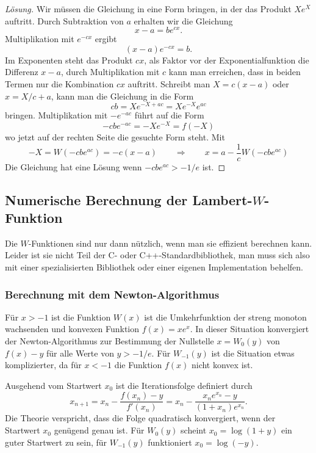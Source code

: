 \begin{proof}[Lösung]
Wir müssen die Gleichung in eine Form bringen, in der das Produkt 
$Xe^X$ auftritt.
Durch Subtraktion von $a$ erhalten wir die Gleichung 
\[
x-a = be^{cx}.
\]
Multiplikation mit $e^{-cx}$ ergibt
\[
(x-a)e^{-cx}=b.
\]
Im Exponenten steht das Produkt $cx$, als Faktor vor der Exponentialfunktion
die Differenz $x-a$, durch Multiplikation mit $c$ kann man erreichen,
dass in beiden Termen nur die Kombination $cx$ auftritt.
Schreibt man $X=c(x-a)$ oder $x=X/c+a$, kann man die Gleichung in die Form
\[
cb
=
Xe^{-X+ac}
=
Xe^{-X}e^{ac}
\]
bringen.
Multiplikation mit $-e^{-ac}$ führt auf die Form
\[
-cbe^{-ac}
=
-Xe^{-X}
=
f(-X)
\]
wo jetzt auf der rechten Seite die gesuchte Form steht.
Mit 
\[
-X
=
W(-cbe^{ac})
=
-c(x-a)
\qquad\Rightarrow\qquad
x
=
a
-
\frac{1}{c}
W(-cbe^{ac})
\]
Die Gleichung hat eine Lösung wenn $-cbe^{ac} > -1/e$ ist.
\end{proof}

%
%
\subsection{Numerische Berechnung der Lambert-$W$-Funktion
\label{buch:subsection:lambertberechnung}}
Die $W$-Funktionen sind nur dann nützlich, wenn man sie effizient
berechnen kann.
Leider ist sie nicht Teil der C- oder C++-Standardbibliothek,
man muss sich also mit einer spezialisierten Bibliothek oder einer
eigenen Implementation behelfen.

%
%
\subsubsection{Berechnung mit dem Newton-Algorithmus}
Für $x>-1$ ist die Funktion $W(x)$ ist die Umkehrfunktion der
streng monoton wachsenden und konvexen Funktion $f(x)=xe^x$.
In dieser Situation konvergiert der Newton-Algorithmus zur Bestimmung
%
%
der Nullstelle $x=W_0(y)$ von $f(x)-y$ für alle Werte von $y>-1/e$.
Für $W_{-1}(y)$ ist die Situation etwas komplizierter, da für
$x<-1$ die Funktion $f(x)$ nicht konvex ist.

Ausgehend vom Startwert $x_0$ ist die Iterationsfolge definiert
durch
\[
x_{n+1}
=
x_n - \frac{f(x_n) - y}{f'(x_n)}
=
x_n - \frac{x_ne^{x_n}-y}{(1+x_n)e^{x_n}}.
\]
Die Theorie verspricht, dass die Folge quadratisch konvergiert, wenn
der Startwert $x_0$ genügend genau ist.
Für $W_0(y)$ scheint $x_0=\log(1+y)$ ein guter Startwert zu sein, für
$W_{-1}(y)$ funktioniert $x_0=\log(-y)$.

